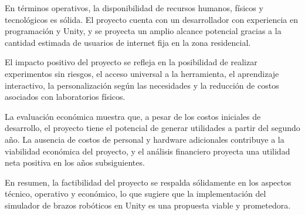 En términos operativos, la disponibilidad de recursos humanos, físicos y tecnológicos es sólida. El proyecto cuenta con un desarrollador con experiencia en programación y Unity, y se proyecta un amplio alcance potencial gracias a la cantidad estimada de usuarios de internet fija en la zona residencial.

El impacto positivo del proyecto se refleja en la posibilidad de realizar experimentos sin riesgos, el acceso universal a la herramienta, el aprendizaje interactivo, la personalización según las necesidades y la reducción de costos asociados con laboratorios físicos.

La evaluación económica muestra que, a pesar de los costos iniciales de desarrollo, el proyecto tiene el potencial de generar utilidades a partir del segundo año. La ausencia de costos de personal y hardware adicionales contribuye a la viabilidad económica del proyecto, y el análisis financiero proyecta una utilidad neta positiva en los años subsiguientes.

En resumen, la factibilidad del proyecto se respalda sólidamente en los aspectos técnico, operativo y económico, lo que sugiere que la implementación del simulador de brazos robóticos en Unity es una propuesta viable y prometedora.